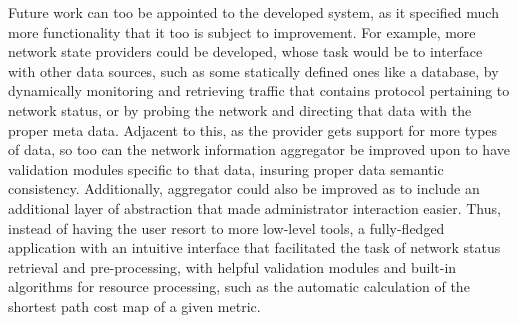     Future work can too be appointed to the developed system, as it specified much more functionality that it too is subject to improvement.
    For example, more network state providers could be developed, whose task would be to interface with other data sources, such as some statically defined ones like a database, by dynamically monitoring and retrieving traffic that contains protocol pertaining to network status, or by probing the network and directing that data with the proper meta data.
    Adjacent to this, as the provider gets support for more types of data, so too can the network information aggregator be improved upon to have validation modules specific to that data, insuring proper data semantic consistency.
    Additionally, aggregator could also be improved as to include an additional layer of abstraction that made administrator interaction easier.
    Thus, instead of having the user resort to more low-level tools, a fully-fledged application with an intuitive interface that facilitated the task of network status retrieval and pre-processing, with helpful validation modules and built-in algorithms for resource processing, such as the automatic calculation of the shortest path cost map of a given metric.

\label{sec:future-work}

